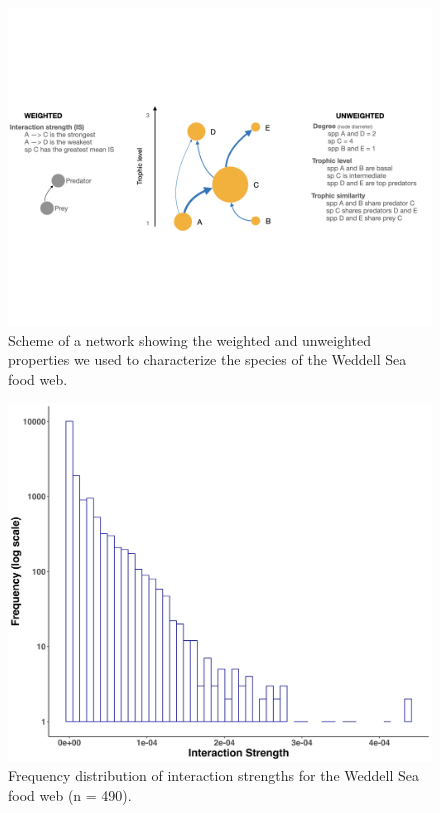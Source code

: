 \documentclass[gc, manuscript]{copernicus}
\begin{document}
\clearpage

\begin{figure}
\includegraphics[width=12cm]{Fig.2_ToyFoodWeb} \caption{Scheme of a network showing the weighted and unweighted properties we used to characterize the species of the Weddell Sea food web.}\label{fig:unnamed-chunk-2}
\end{figure}

\clearpage

\begin{figure}
\includegraphics[width=12cm]{Fig3_IntDist} \caption{Frequency distribution of interaction strengths for the Weddell Sea food web (n = 490).}\label{fig:unnamed-chunk-3}
\end{figure}

\clearpage
\end{document}
